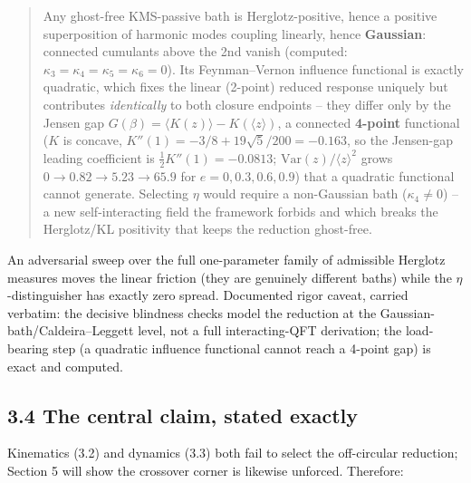 \documentclass[
]{article}
\begin{document}
\begin{quote}
Any ghost-free KMS-passive bath is Herglotz-positive, hence a positive
superposition of harmonic modes coupling linearly, hence
\textbf{Gaussian}: connected cumulants above the 2nd vanish (computed:
\(\kappa_3 = \kappa_4 = \kappa_5 = \kappa_6 = 0\)). Its Feynman--Vernon
influence functional is exactly quadratic, which fixes the linear
(2-point) reduced response uniquely but contributes \emph{identically}
to both closure endpoints -- they differ only by the Jensen gap
\(G(\beta) = \langle K(z)\rangle - K(\langle z\rangle)\), a connected
\textbf{4-point} functional (\(K\) is concave,
\(K''(1) = -3/8 + 19\sqrt5/200 = -0.163\), so the Jensen-gap leading
coefficient is \(\tfrac{1}{2}K''(1) = -0.0813\);
\(\mathrm{Var}(z)/\langle z\rangle^2\) grows
\(0 \to 0.82 \to 5.23 \to 65.9\) for \(e = 0, 0.3, 0.6, 0.9\)) that a
quadratic functional cannot generate. Selecting \(\eta\) would require a
non-Gaussian bath (\(\kappa_4 \ne 0\)) -- a new self-interacting field
the framework forbids and which breaks the Herglotz/KL positivity that
keeps the reduction ghost-free.
\end{quote}

An adversarial sweep over the full one-parameter family of admissible
Herglotz measures moves the linear friction (they are genuinely
different baths) while the \(\eta\)-distinguisher has exactly zero
spread. Documented rigor caveat, carried verbatim: the decisive
blindness checks model the reduction at the
Gaussian-bath/Caldeira--Leggett level, not a full interacting-QFT
derivation; the load-bearing step (a quadratic influence functional
cannot reach a 4-point gap) is exact and computed.

\subsection{3.4 The central claim, stated
exactly}\label{the-central-claim-stated-exactly}

Kinematics (3.2) and dynamics (3.3) both fail to select the off-circular
reduction; Section 5 will show the crossover corner is likewise
unforced. Therefore:
\end{document}
